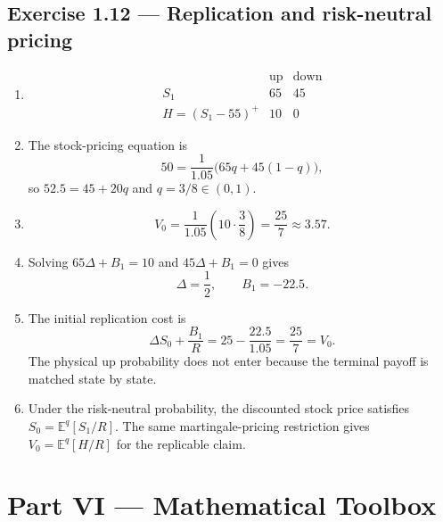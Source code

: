 \documentclass[11pt]{article}
\newcommand{\E}{\mathbb{E}}
\newcommand{\1}{\mathbf{1}}
\begin{document}
\subsection*{Exercise 1.12 --- Replication and risk-neutral pricing}
\begin{enumerate}
  \item
  \[
  \begin{array}{c|cc}
   & \text{up} & \text{down}\\ \hline
  S_1&65&45\\
  H=(S_1-55)^+&10&0
  \end{array}
  \]
  \item The stock-pricing equation is
  \[
  50=\frac1{1.05}\bigl(65q+45(1-q)\bigr),
  \]
  so $52.5=45+20q$ and $q=3/8\in(0,1)$.
  \item
  \[
  V_0=\frac1{1.05}\left(10\cdot\frac38\right)=\frac{25}{7}\approx3.57.
  \]
  \item Solving
  $65\Delta+B_1=10$ and $45\Delta+B_1=0$ gives
  \[
  \Delta=\frac12,
  \qquad
  B_1=-22.5.
  \]
  \item The initial replication cost is
  \[
  \Delta S_0+\frac{B_1}{R}
  =25-\frac{22.5}{1.05}
  =\frac{25}{7}=V_0.
  \]
  The physical up probability does not enter because the terminal payoff is
  matched state by state.
  \item Under the risk-neutral probability, the discounted stock price
  satisfies $S_0=\E^q[S_1/R]$. The same martingale-pricing restriction gives
  $V_0=\E^q[H/R]$ for the replicable claim.
\end{enumerate}

\section*{Part VI --- Mathematical Toolbox}
\end{document}
